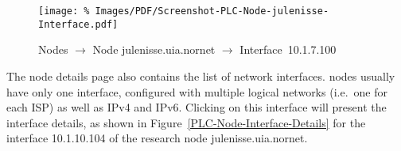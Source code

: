 \begin{figure*}
\begin{center}
\texttt{[image: \%
   Images/PDF/Screenshot-PLC-Node-julenisse-Interface.pdf]}
\end{center}
\caption{Nodes $\rightarrow$ Node julenisse.uia.nornet $\rightarrow$ Interface~10.1.7.100}
\label{cap:PLC-Node-Interface-Details}
\end{figure*}

The node details page also contains the list of network interfaces.  nodes usually have only one interface, configured with multiple logical networks (i.e.\ one for each ISP) as well as IPv4 and IPv6. Clicking on this interface will present the interface details, as shown in Figure~\ref{PLC-Node-Interface-Details} for the interface 10.1.10.104 of the research node julenisse.uia.nornet.

